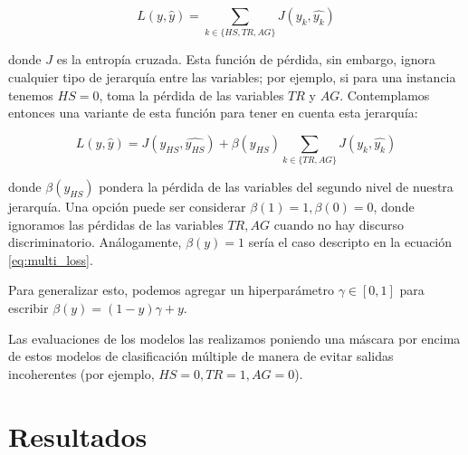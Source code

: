 \begin{equation}
\label{eq:multi_loss}
L(y, \widehat{y}) = \sum\limits_{k \in \{HS, TR, AG\}} J(y_k, \widehat{y_k})
\end{equation}

donde $J$ es la entropía cruzada. Esta función de pérdida, sin embargo, ignora cualquier tipo de jerarquía entre las variables; por ejemplo, si para una instancia tenemos $HS = 0$, toma la pérdida de las variables $TR$ y $AG$. Contemplamos entonces una variante de esta función para tener en cuenta esta jerarquía:

\begin{equation}
    \label{eq:hierarchical_loss}
    L(y, \widehat{y}) =  J(y_{HS}, \widehat{y_{HS}}) + \beta(y_{HS})\sum\limits_{k \in \{TR, AG\}} J(y_k, \widehat{y_k})
\end{equation}

donde $\beta(y_{HS})$ pondera la pérdida de las variables del segundo nivel de nuestra jerarquía. Una opción puede ser considerar $\beta(1) = 1, \beta(0) = 0$, donde ignoramos las pérdidas de las variables $TR, AG$ cuando no hay discurso discriminatorio. Análogamente, $\beta(y) = 1$ sería el caso descripto en la ecuación \ref{eq:multi_loss}.

Para generalizar esto, podemos agregar un hiperparámetro $\gamma \in [0, 1]$ para escribir $\beta(y) = (1-y) \gamma + y$.

Las evaluaciones de los modelos las realizamos poniendo una máscara por encima de estos modelos de clasificación múltiple de manera de evitar salidas incoherentes (por ejemplo, $HS = 0, TR = 1, AG= 0$).


\section{Resultados}
\newcommand{\esrow}[1]{\multirow{#1}{*}{es}}
\newcommand{\enrow}[1]{\multirow{#1}{*}{en}}
\newcommand{\tbf}[1]{\textbf{#1}}


